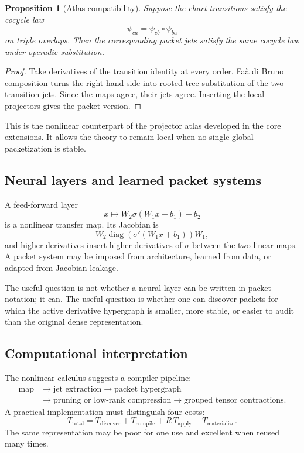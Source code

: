 \documentclass[11pt]{article}
\newtheorem{proposition}[theorem]{Proposition}
\theoremstyle{definition}
\theoremstyle{remark}
\begin{document}
\begin{proposition}[Atlas compatibility]
Suppose the chart transitions satisfy the cocycle law
\[
\psi_{ca}=\psi_{cb}\circ\psi_{ba}
\]
on triple overlaps.  Then the corresponding packet jets satisfy the same cocycle law under operadic substitution.
\end{proposition}

\begin{proof}
Take derivatives of the transition identity at every order.  Fa\`a di Bruno composition turns the right-hand side into rooted-tree substitution of the two transition jets.  Since the maps agree, their jets agree.  Inserting the local projectors gives the packet version.
\end{proof}

This is the nonlinear counterpart of the projector atlas developed in the core extensions.  It allows the theory to remain local when no single global packetization is stable.


\subsection{Neural layers and learned packet systems}

A feed-forward layer
\[
x\longmapsto W_2\sigma(W_1x+b_1)+b_2
\]
is a nonlinear transfer map.  Its Jacobian is
\[
W_2\operatorname{diag}(\sigma'(W_1x+b_1))W_1,
\]
and higher derivatives insert higher derivatives of $\sigma$ between the two linear maps.  A packet system may be imposed from architecture, learned from data, or adapted from Jacobian leakage.

The useful question is not whether a neural layer can be written in packet notation; it can.  The useful question is whether one can discover packets for which the active derivative hypergraph is smaller, more stable, or easier to audit than the original dense representation.

\subsection{Computational interpretation}

The nonlinear calculus suggests a compiler pipeline:
\[
\begin{aligned}
\text{map}
&\longrightarrow
\text{jet extraction}
\longrightarrow
\text{packet hypergraph}\\
&\longrightarrow
\text{pruning or low-rank compression}
\longrightarrow
\text{grouped tensor contractions}.
\end{aligned}
\]
A practical implementation must distinguish four costs:
\[
T_{\mathrm{total}}
=
T_{\mathrm{discover}}
+
T_{\mathrm{compile}}
+
R\,T_{\mathrm{apply}}
+
T_{\mathrm{materialize}}.
\]
The same representation may be poor for one use and excellent when reused many times.
\end{document}
